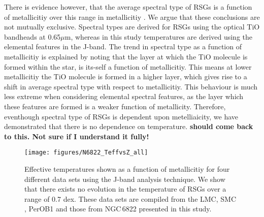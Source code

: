 \documentclass[manuscript]{aastex}
\begin{document}
There is evidence however,
that the average spectral type of RSGs is a function of metallicitiy over this range in metallicitiy
\citep{Levesque12}.
We argue that these conclusions are not mutually exclusive.
Spectral types are derived for RSGs using the optical TiO bandheads at 0.65$\mu$m,
whereas in this study temperatures are derived using the elemental features in the J-band.
The trend in spectral type as a function of metallicitiy is explained by noting that the layer at which the TiO molecule is formed within the star, is its-self a function of metallicitiy.
This means at lower metallicitiy the TiO molecule is formed in a higher layer,
which gives rise to a shift in average spectral type with respect to metallicitiy.
This behaviour is much less extreme when considering elemental spectral features,
as the layer which these features are formed is a weaker function of metallicity.
Therefore, eventhough spectral type of RSGs is dependent upon metelliaicity,
we have demonstrated that there is no dependence on temperature.
\textbf{should come back to this. Not sure if I understand it fully!}



\begin{figure}
\texttt{[image: figures/N6822\_TeffvsZ\_all]}
\caption{
Effective temperatures shown as a function of metallicitiy for four different data sets using the J-band analysis technique.
We show that there exists no evolution in the temperature of RSGs over a range of 0.7 dex.
These data sets are compiled from the LMC, SMC
\protect\citep[blue and red points respectively;][]{Davies14}, PerOB1
\protect\citep[a galactic RSG cluster; cyan points;][]{2014ApJ...788...58G} and those from NGC\,6822 presented in this study.
         }
 \label{fig:TvsZ}
\end{figure}
\end{document}
